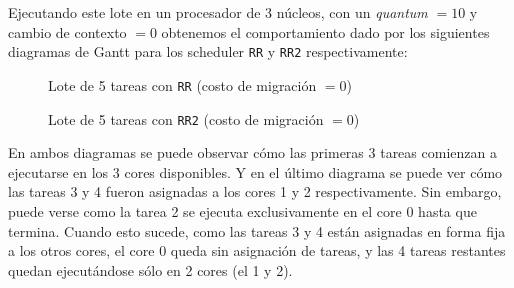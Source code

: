 Ejecutando este lote en un procesador de 3 núcleos, con un \textit{quantum} $= 10$ y cambio de contexto $= 0$ obtenemos el comportamiento dado por los siguientes diagramas de Gantt para los scheduler \texttt{RR} y \texttt{RR2} respectivamente:

\begin{figure}[h!t]
  \centering
  \caption{Lote de 5 tareas con \texttt{RR} (costo de migración $= 0$)}
  \label{fig:fig81}
\end{figure}

\begin{figure}[h!t]
  \centering
  \caption{Lote de 5 tareas con \texttt{RR2} (costo de migración $= 0$)}
  \label{fig:fig82}
\end{figure}

\FloatBarrier
En ambos diagramas se puede observar cómo las primeras 3 tareas comienzan a ejecutarse en los 3 cores disponibles. Y en el último diagrama se puede ver cómo las tareas 3 y 4 fueron asignadas a los cores 1 y 2 respectivamente. Sin embargo, puede verse como la tarea 2 se ejecuta exclusivamente en el core 0 hasta que termina. Cuando esto sucede, como las tareas 3 y 4 están asignadas en forma fija a los otros cores, el core 0 queda sin asignación de tareas, y las 4 tareas restantes quedan ejecutándose sólo en 2 cores (el 1 y 2).

